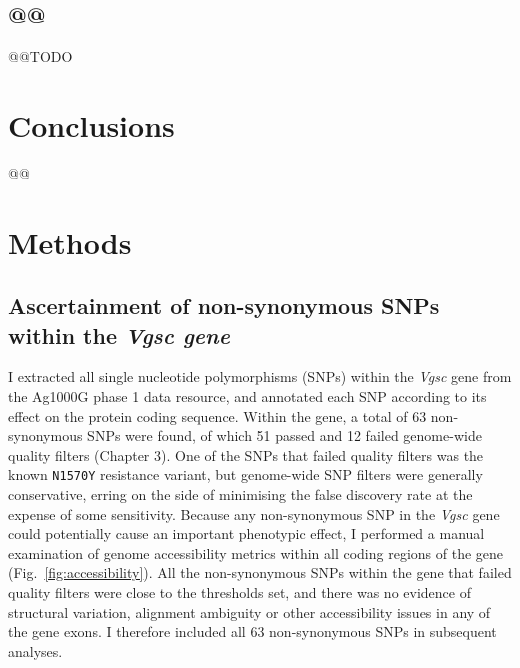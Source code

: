 \documentclass[a4paper,11pt,abstracton,hidelinks]{scrartcl}
\begin{document}
\subsection{@@}\label{subsec:results-@@}


@@TODO


\section{Conclusions}\label{sec:conclusions}


@@


\section{Methods}\label{sec:methods}


\subsection{Ascertainment of non-synonymous SNPs within the \textit{Vgsc gene}}\label{subsec:methods-asc}


I extracted all single nucleotide polymorphisms (SNPs) within the \textit{Vgsc} gene from the Ag1000G phase 1 data resource, and annotated each SNP according to its effect on the protein coding sequence.
%
Within the gene, a total of 63 non-synonymous SNPs were found, of which 51 passed and 12 failed genome-wide quality filters (Chapter 3).
%
One of the SNPs that failed quality filters was the known \texttt{N1570Y} resistance variant, but genome-wide SNP filters were generally conservative, erring on the side of minimising the false discovery rate at the expense of some sensitivity.
%
Because any non-synonymous SNP in the \textit{Vgsc} gene could potentially cause an important phenotypic effect, I performed a manual examination of genome accessibility metrics within all coding regions of the gene (Fig.~\ref{fig:accessibility}).
%
All the non-synonymous SNPs within the gene that failed quality filters were close to the thresholds set, and there was no evidence of structural variation, alignment ambiguity or other accessibility issues in any of the gene exons.
%
I therefore included all 63 non-synonymous SNPs in subsequent analyses.
\end{document}
